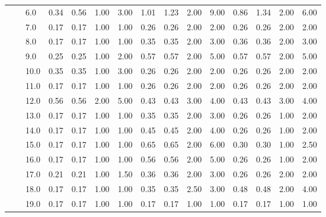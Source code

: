 \begin{tabular}{lllrrrrrrrrrrrr}
       &     & 6.0  &       0.34 &      0.56 & 1.00 &   3.00 &       1.01 &      1.23 &  2.00 &   9.00 &       0.86 &      1.34 &  2.00 &   6.00 \\
       &     & 7.0  &       0.17 &      0.17 & 1.00 &   1.00 &       0.26 &      0.26 &  2.00 &   2.00 &       0.26 &      0.26 &  2.00 &   2.00 \\
       &     & 8.0  &       0.17 &      0.17 & 1.00 &   1.00 &       0.35 &      0.35 &  2.00 &   3.00 &       0.36 &      0.36 &  2.00 &   3.00 \\
       &     & 9.0  &       0.25 &      0.25 & 1.00 &   2.00 &       0.57 &      0.57 &  2.00 &   5.00 &       0.57 &      0.57 &  2.00 &   5.00 \\
       &     & 10.0 &       0.35 &      0.35 & 1.00 &   3.00 &       0.26 &      0.26 &  2.00 &   2.00 &       0.26 &      0.26 &  2.00 &   2.00 \\
       &     & 11.0 &       0.17 &      0.17 & 1.00 &   1.00 &       0.26 &      0.26 &  2.00 &   2.00 &       0.26 &      0.26 &  2.00 &   2.00 \\
       &     & 12.0 &       0.56 &      0.56 & 2.00 &   5.00 &       0.43 &      0.43 &  3.00 &   4.00 &       0.43 &      0.43 &  3.00 &   4.00 \\
       &     & 13.0 &       0.17 &      0.17 & 1.00 &   1.00 &       0.35 &      0.35 &  2.00 &   3.00 &       0.26 &      0.26 &  1.00 &   2.00 \\
       &     & 14.0 &       0.17 &      0.17 & 1.00 &   1.00 &       0.45 &      0.45 &  2.00 &   4.00 &       0.26 &      0.26 &  1.00 &   2.00 \\
       &     & 15.0 &       0.17 &      0.17 & 1.00 &   1.00 &       0.65 &      0.65 &  2.00 &   6.00 &       0.30 &      0.30 &  1.00 &   2.50 \\
       &     & 16.0 &       0.17 &      0.17 & 1.00 &   1.00 &       0.56 &      0.56 &  2.00 &   5.00 &       0.26 &      0.26 &  1.00 &   2.00 \\
       &     & 17.0 &       0.21 &      0.21 & 1.00 &   1.50 &       0.36 &      0.36 &  2.00 &   3.00 &       0.26 &      0.26 &  2.00 &   2.00 \\
       &     & 18.0 &       0.17 &      0.17 & 1.00 &   1.00 &       0.35 &      0.35 &  2.50 &   3.00 &       0.48 &      0.48 &  2.00 &   4.00 \\
       &     & 19.0 &       0.17 &      0.17 & 1.00 &   1.00 &       0.17 &      0.17 &  1.00 &   1.00 &       0.17 &      0.17 &  1.00 &   1.00 \\

\end{tabular}
